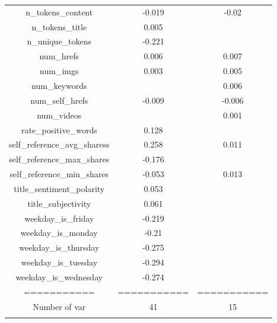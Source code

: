 \begin{table}[h]
\begin{tabular}{@{\extracolsep{5pt}} ccc}
n\_tokens\_content & -0.019 & -0.02 \\ 
n\_tokens\_title & 0.005 &  \\ 
n\_unique\_tokens & -0.221 &  \\ 
num\_hrefs & 0.006 & 0.007 \\ 
num\_imgs & 0.003 & 0.005 \\ 
num\_keywords &  & 0.006 \\ 
num\_self\_hrefs & -0.009 & -0.006 \\ 
num\_videos &  & 0.001 \\ 
rate\_positive\_words & 0.128 &  \\ 
self\_reference\_avg\_sharess & 0.258 & 0.011 \\ 
self\_reference\_max\_shares & -0.176 &  \\ 
self\_reference\_min\_shares & -0.053 & 0.013 \\ 
title\_sentiment\_polarity & 0.053 &  \\ 
title\_subjectivity & 0.061 &  \\ 
weekday\_is\_friday & -0.219 &  \\ 
weekday\_is\_monday & -0.21 &  \\ 
weekday\_is\_thursday & -0.275 &  \\ 
weekday\_is\_tuesday & -0.294 &  \\ 
weekday\_is\_wednesday & -0.274 &  \\ 
=========== & =========== & =========== \\ 
Number of var & 41 & 15 \\ 
\hline \\[-1.8ex] 
\end{tabular} 
\end{table} 
